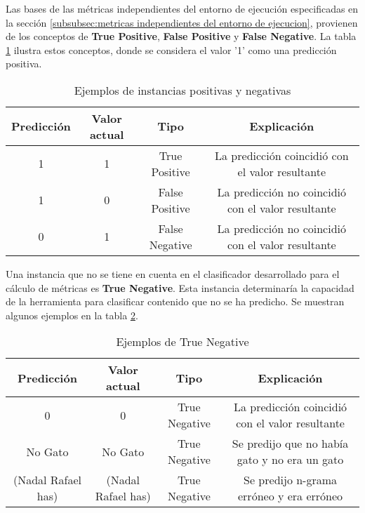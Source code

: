 Las bases de las métricas independientes del entorno de ejecución especificadas en la sección
\ref{subsubsec:metricas independientes del entorno de ejecucion}, provienen de los conceptos de 
\textbf{True Positive}, \textbf{False Positive} y \textbf{False Negative}. La tabla 
\ref{tab:ejemplos de instancias positivas y negativas} ilustra estos conceptos, donde se considera el 
valor '1' como una predicción positiva.

\begin{table}[h]
  \begin{center}
  \begin{tabular}{| c | c | c | c |} \hline
  \textbf{Predicción} & \textbf{Valor actual} & \textbf{Tipo} & \textbf{Explicación}\\ \hline
  1 & 1 & True Positive & La predicción coincidió con el valor resultante \\ \hline
  1 & 0 & False Positive & La predicción no coincidió con el valor resultante \\ \hline
  0 & 1 & False Negative & La predicción no coincidió con el valor resultante \\ \hline
  \end{tabular}
  \caption{Ejemplos de instancias positivas y negativas}
  \label{tab:ejemplos de instancias positivas y negativas}
  \end{center}
\end{table}

Una instancia que no se tiene en cuenta en el clasificador desarrollado para el cálculo de métricas es 
\textbf{True Negative}. Esta instancia determinaría la capacidad de la herramienta para clasificar contenido 
que no se ha predicho. Se muestran algunos ejemplos en la tabla \ref{tab:ejemplos de true negative}.

\begin{table}[h]
  \begin{center}
  \begin{tabular}{| c | c | c | c |} \hline
  \textbf{Predicción} & \textbf{Valor actual} & \textbf{Tipo} & \textbf{Explicación}\\ \hline
  0 & 0 & True Negative & La predicción coincidió con el valor resultante \\ \hline
  No Gato & No Gato & True Negative & Se predijo que no había gato y no era un gato \\ \hline
  (Nadal Rafael has) & (Nadal Rafael has) & True Negative & Se predijo n-grama erróneo y era erróneo \\ \hline
  \end{tabular}
  \caption{Ejemplos de True Negative}
  \label{tab:ejemplos de true negative}
  \end{center}
\end{table}

